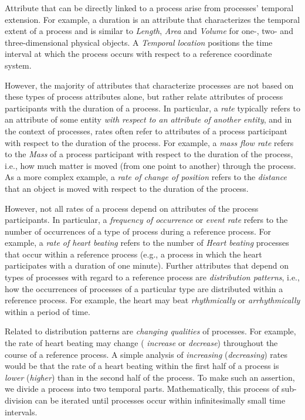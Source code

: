 \documentclass{bioinfo}
\begin{document}
Attribute that can be directly linked to a process arise from
processes' temporal extension. For example, a duration is an attribute
that characterizes the temporal extent of a process and is similar to
{\em Length}, {\em Area} and {\em Volume} for one-, two- and
three-dimensional physical objects. A {\em Temporal location}
positions the time interval at which the process occurs with respect
to a reference coordinate system.

However, the majority of attributes that characterize processes are
not based on these types of process attributes alone, but rather
relate attributes of process participants with the duration of a
process. In particular, a {\em rate} typically refers to an attribute
of some entity {\em with respect to an attribute of another entity},
and in the context of processes, rates often refer to attributes of a
process participant with respect to the duration of the process. For
example, a {\em mass flow rate} refers to the {\em Mass} of a process
participant with respect to the duration of the process, i.e., how
much matter is moved (from one point to another) through the process.
As a more complex example, a {\em rate of change of position} refers
to the {\em distance} that an object is moved with respect to the
duration of the process.

However, not all rates of a process depend on attributes of the
process participants. In particular, a {\em frequency of occurrence}
or {\em event rate} refers to the number of occurrences of a type of
process during a reference process. For example, a {\em rate of heart
  beating} refers to the number of {\em Heart beating} processes that
occur within a reference process (e.g., a process in which the heart
participates with a duration of one minute). Further attributes that
depend on types of processes with regard to a reference process are
{\em distribution patterns}, i.e., how the occurrences of processes of
a particular type are distributed within a reference process. For
example, the heart may beat {\em rhythmically} or {\em arrhythmically}
within a period of time.

Related to distribution patterns are {\em changing qualities} of
processes. For example, the rate of heart beating may change ({\em
  increase} or {\em decrease}) throughout the course of a reference
process. A simple analysis of {\em increasing} ({\em decreasing})
rates would be that the rate of a heart beating within the first half
of a process is {\em lower} ({\em higher}) than in the second half of
the process. To make such an assertion, we divide a process into two
temporal parts. Mathematically, this process of sub-division can be
iterated until processes occur within infinitesimally small time
intervals.
\end{document}
